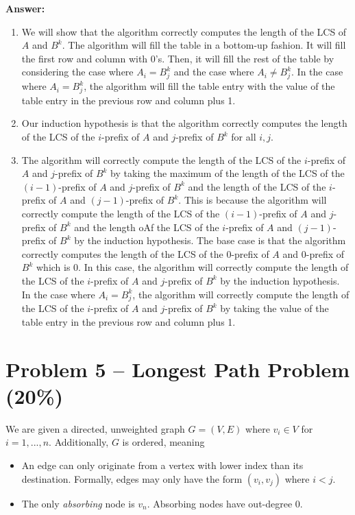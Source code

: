 \documentclass[12pt,letterpaper]{article}
\begin{document}
\begin{enumerate}
    \textbf{Answer:}
    \begin{enumerate}
        \item We will show that the algorithm correctly computes the length of the LCS of $A$ and $B^k$.
        The algorithm will fill the table in a bottom-up fashion. It will fill the first row and column with 0's. 
        Then, it will fill the rest of the table by considering the case where $A_i=B^k_j$ and the case where $A_i \neq B^k_j$.
        In the case where $A_i=B^k_j$, the algorithm will fill the table entry with the value of the table entry in the previous row and column plus 1. 
        \item Our induction hypothesis is that the algorithm correctly computes the length of the LCS of the $i$-prefix of $A$ and $j$-prefix of $B^k$ for all $i,j$.
        \item The algorithm will correctly compute the length of the LCS of the $i$-prefix of $A$ and $j$-prefix of $B^k$ by taking the maximum of the length of the LCS of the $(i-1)$-prefix of $A$ and $j$-prefix of $B^k$ and the length of the LCS of the $i$-prefix of $A$ and $(j-1)$-prefix of $B^k$.
        This is because the algorithm will correctly compute the length of the LCS of the $(i-1)$-prefix of $A$ and $j$-prefix of $B^k$ and the length oAf the LCS of the $i$-prefix of $A$ and $(j-1)$-prefix of $B^k$ by the induction hypothesis.
        The base case is that the algorithm correctly computes the length of the LCS of the $0$-prefix of $A$ and $0$-prefix of $B^k$ which is 0. In this case, the algorithm will correctly compute the length of the LCS of the $i$-prefix of $A$ and $j$-prefix of $B^k$ by the induction hypothesis. 
        In the case where $A_i=B^k_j$, the algorithm will correctly compute the length of the LCS of the $i$-prefix of $A$ and $j$-prefix of $B^k$ by taking the value of the table entry in the previous row and column plus 1. 



    \end{enumerate}
    
\end{enumerate}

\newpage

\newpage


\section*{Problem 5 -- Longest Path Problem (20\%)}
We are given a directed, unweighted graph $G=(V,E)$ where $v_i \in V$ for $i=1,...,n$.
Additionally, $G$ is ordered, meaning
\begin{itemize}
    \item An edge can only originate from a vertex with lower index than its destination. Formally, edges may only have the form $(v_i,v_j)$ where $i<j$.
    \item The only \textit{absorbing} node is $v_n$. Absorbing nodes have out-degree $0$.
\end{itemize}
\end{document}
